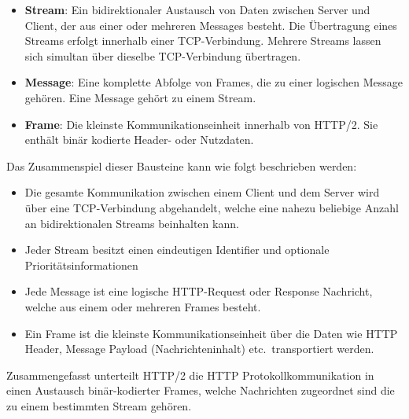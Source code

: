 \documentclass[a4paper, justified, notoc]{tufte-handout} %
\begin{document}
\begin{itemize}
	\item \textbf{Stream}: Ein bidirektionaler Austausch von Daten zwischen Server und Client, der aus einer oder mehreren Messages besteht. Die Übertragung eines Streams erfolgt innerhalb einer TCP-Verbindung. Mehrere Streams lassen sich simultan über dieselbe TCP-Verbindung übertragen.
	\item \textbf{Message}: Eine komplette Abfolge von Frames, die zu einer logischen Message gehören. Eine Message gehört zu einem Stream.
	\item \textbf{Frame}: Die kleinste Kommunikationseinheit innerhalb von HTTP/2. Sie enthält binär kodierte Header- oder Nutzdaten.
\end{itemize}

Das Zusammenspiel dieser Bausteine kann wie folgt beschrieben werden:
\begin{itemize}
	\item Die gesamte Kommunikation zwischen einem Client und dem Server wird über eine TCP-Verbindung abgehandelt, welche eine nahezu beliebige Anzahl an bidirektionalen Streams beinhalten kann.
	\item Jeder Stream besitzt einen eindeutigen Identifier und optionale Prioritätsinformationen
	\item Jede Message ist eine logische HTTP-Request oder Response Nachricht, welche aus einem oder mehreren Frames besteht.
	\item Ein Frame ist die kleinste Kommunikationseinheit über die Daten wie HTTP Header, Message Payload (Nachrichteninhalt) etc.\ transportiert werden. 
\end{itemize}

Zusammengefasst unterteilt HTTP/2 die HTTP Protokollkommunikation in einen Austausch binär-kodierter Frames, welche Nachrichten zugeordnet sind die zu einem bestimmten Stream gehören.  
\end{document}
